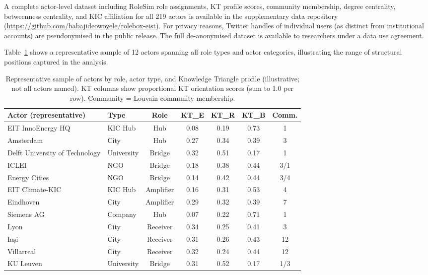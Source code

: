 \documentclass[review,12pt]{elsarticle}
\begin{document}
A complete actor-level dataset including RoleSim role assignments, KT profile scores, community membership, degree centrality, betweenness centrality, and KIC affiliation for all 219 actors is available in the supplementary data repository (\url{https://github.com/babajideowoyele/rolebox-eist}). For privacy reasons, Twitter handles of individual users (as distinct from institutional accounts) are pseudonymised in the public release. The full de-anonymised dataset is available to researchers under a data use agreement.

Table~\ref{tab:sample-actors} shows a representative sample of 12 actors spanning all role types and actor categories, illustrating the range of structural positions captured in the analysis.

\begin{table}[htbp]
\centering
\caption{Representative sample of actors by role, actor type, and Knowledge Triangle profile (illustrative; not all actors named). KT columns show proportional KT orientation scores (sum to 1.0 per row). Community = Louvain community membership.}
\label{tab:sample-actors}
\small
\begin{tabular}{@{}llccccc@{}}
\toprule
\textbf{Actor (representative)} & \textbf{Type} & \textbf{Role} & \textbf{KT\_E} & \textbf{KT\_R} & \textbf{KT\_B} & \textbf{Comm.} \\
\midrule
EIT InnoEnergy HQ             & KIC Hub    & Hub      & 0.08 & 0.19 & 0.73 & 1 \\
Amsterdam                     & City       & Hub      & 0.27 & 0.34 & 0.39 & 3 \\
Delft University of Technology & University & Bridge   & 0.32 & 0.51 & 0.17 & 1 \\
ICLEI                         & NGO        & Bridge   & 0.18 & 0.38 & 0.44 & 3/1 \\
Energy Cities                 & NGO        & Bridge   & 0.14 & 0.42 & 0.44 & 3/4 \\
EIT Climate-KIC               & KIC Hub    & Amplifier & 0.16 & 0.31 & 0.53 & 4 \\
Eindhoven                     & City       & Amplifier & 0.29 & 0.32 & 0.39 & 7 \\
Siemens AG                    & Company    & Hub      & 0.07 & 0.22 & 0.71 & 1 \\
Lyon                          & City       & Receiver & 0.34 & 0.25 & 0.41 & 3 \\
Iași                          & City       & Receiver & 0.31 & 0.26 & 0.43 & 12 \\
Villarreal                    & City       & Receiver & 0.32 & 0.24 & 0.44 & 12 \\
KU Leuven                     & University & Bridge   & 0.31 & 0.52 & 0.17 & 1/3 \\
\bottomrule
\end{tabular}
\end{table}
\end{document}
